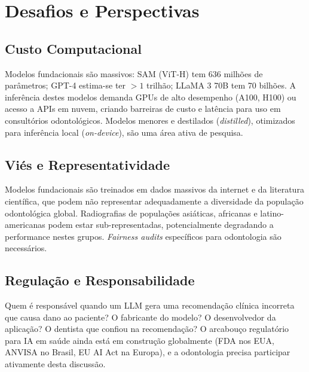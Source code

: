 
\section{Desafios e Perspectivas}

\subsection{Custo Computacional}

Modelos fundacionais são massivos: SAM (ViT-H) tem 636 milhões de parâmetros; GPT-4 estima-se ter $>1$ trilhão; LLaMA 3 70B tem 70 bilhões. A inferência destes modelos demanda GPUs de alto desempenho (A100, H100) ou acesso a APIs em nuvem, criando barreiras de custo e latência para uso em consultórios odontológicos. Modelos menores e destilados (\textit{distilled}), otimizados para inferência local (\textit{on-device}), são uma área ativa de pesquisa.

\subsection{Viés e Representatividade}

Modelos fundacionais são treinados em dados massivos da internet e da literatura científica, que podem não representar adequadamente a diversidade da população odontológica global. Radiografias de populações asiáticas, africanas e latino-americanas podem estar sub-representadas, potencialmente degradando a performance nestes grupos. \textit{Fairness audits} específicos para odontologia são necessários.

\subsection{Regulação e Responsabilidade}

Quem é responsável quando um LLM gera uma recomendação clínica incorreta que causa dano ao paciente? O fabricante do modelo? O desenvolvedor da aplicação? O dentista que confiou na recomendação? O arcabouço regulatório para IA em saúde ainda está em construção globalmente (FDA nos EUA, ANVISA no Brasil, EU AI Act na Europa), e a odontologia precisa participar ativamente desta discussão.

